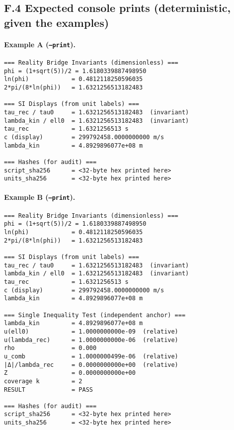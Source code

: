 \documentclass[11pt]{article}
\begin{document}
\begin{proposition}
\subsection*{F.4 Expected console prints (deterministic, given the examples)}

\paragraph{Example A (\texttt{--print}).}
\begin{verbatim}
=== Reality Bridge Invariants (dimensionless) ===
phi = (1+sqrt(5))/2 = 1.6180339887498950
ln(phi)            = 0.4812118250596035
2*pi/(8*ln(phi))   = 1.6321256513182483

=== SI Displays (from unit labels) ===
tau_rec / tau0     = 1.6321256513182483  (invariant)
lambda_kin / ell0  = 1.6321256513182483  (invariant)
tau_rec            = 1.6321256513 s
c (display)        = 299792458.0000000000 m/s
lambda_kin         = 4.8929896077e+08 m

=== Hashes (for audit) ===
script_sha256      = <32-byte hex printed here>
units_sha256       = <32-byte hex printed here>
\end{verbatim}

\paragraph{Example B (\texttt{--print}).}
\begin{verbatim}
=== Reality Bridge Invariants (dimensionless) ===
phi = (1+sqrt(5))/2 = 1.6180339887498950
ln(phi)            = 0.4812118250596035
2*pi/(8*ln(phi))   = 1.6321256513182483

=== SI Displays (from unit labels) ===
tau_rec / tau0     = 1.6321256513182483  (invariant)
lambda_kin / ell0  = 1.6321256513182483  (invariant)
tau_rec            = 1.6321256513 s
c (display)        = 299792458.0000000000 m/s
lambda_kin         = 4.8929896077e+08 m

=== Single Inequality Test (independent anchor) ===
lambda_kin         = 4.8929896077e+08 m
u(ell0)            = 1.0000000000e-09  (relative)
u(lambda_rec)      = 1.0000000000e-06  (relative)
rho                = 0.000
u_comb             = 1.0000000499e-06  (relative)
|Δ|/lambda_rec     = 0.0000000000e+00  (relative)
Z                  = 0.0000000000e+00
coverage k         = 2
RESULT             = PASS

=== Hashes (for audit) ===
script_sha256      = <32-byte hex printed here>
units_sha256       = <32-byte hex printed here>
\end{verbatim}


\end{proposition}
\end{document}
